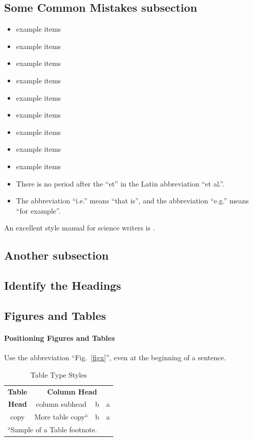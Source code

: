 \documentclass[conference]{IEEEtran}
\begin{document}
\subsection{Some Common Mistakes subsection}\label{SCM}
\begin{itemize}
    \item example items
    \item example items
    \item example items
    \item example items
    \item example items
    \item example items
    \item example items
    \item example items
    \item example items
    \item There is no period after the ``et'' in the Latin abbreviation ``et al.''.
    \item The abbreviation ``i.e.'' means ``that is'', and the abbreviation ``e.g.'' means ``for example''.
\end{itemize}
An excellent style manual for science writers is \cite{b7}.

\subsection{Another subsection}
\lipsum[1]

\subsection{Identify the Headings}
\lipsum[1-2]

\subsection{Figures and Tables}
\paragraph{Positioning Figures and Tables} Use the abbreviation
``Fig.~\ref{figx}'', even at the beginning of a sentence.

\begin{table}[htbp]
    \caption{Table Type Styles}
    \begin{center}
        \begin{tabular}{|c|c|c|c|}
            \hline
            \textbf{Table} & \multicolumn{3}{|c|}{\textbf{Column Head}}         \\
            \cline{2-4}
            \textbf{Head}  & column subhead & b & a \\
            \hline
            copy           & More table copy$^{\mathrm{a}}$ & b & a \\
            \hline
            \multicolumn{4}{l}{$^{\mathrm{a}}$Sample of a Table footnote.}
        \end{tabular}
        \label{tabx}
    \end{center}
\end{table}
\end{document}
